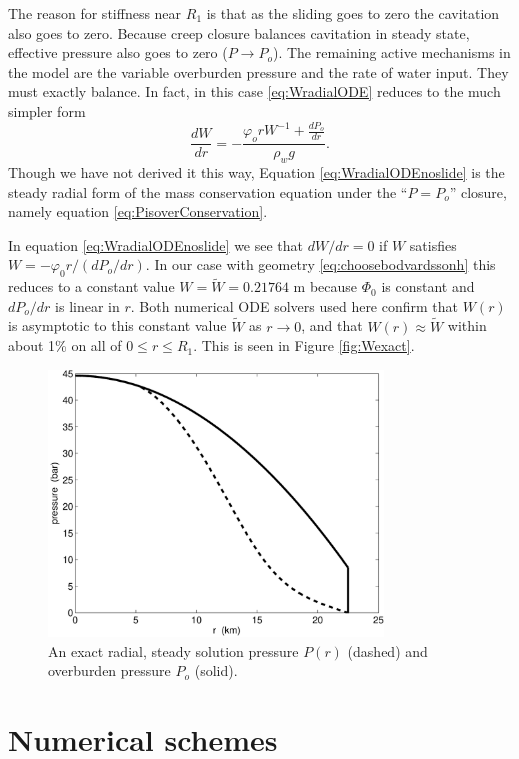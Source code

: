 \documentclass[11pt,final]{amsart}
\begin{document}
The reason for stiffness near $R_1$ is that as the sliding goes to zero the cavitation also goes to zero.  Because creep closure balances cavitation in steady state, effective pressure also goes to zero ($P\to P_o$).  The remaining active mechanisms in the model are the variable overburden pressure and the rate of water input.  They must exactly balance.  In fact, in this case \eqref{eq:WradialODE} reduces to the much simpler form
\begin{equation}
\frac{dW}{dr} = - \frac{\varphi_o r W^{-1} + \frac{dP_o}{dr}}{\rho_w g}. \label{eq:WradialODEnoslide}
\end{equation}
Though we have not derived it this way, Equation \eqref{eq:WradialODEnoslide} is the steady radial form of the mass conservation equation under the ``$P=P_o$'' closure, namely equation \eqref{eq:PisoverConservation}.

In equation \eqref{eq:WradialODEnoslide} we see that $dW/dr=0$ if $W$ satisfies $W = - \varphi_0 r / (dP_o/dr)$.  In our case with geometry \eqref{eq:choosebodvardssonh} this reduces to a constant value $W=\tilde W= 0.21764$ m because $\Phi_0$ is constant and $dP_o/dr$ is linear in $r$.  Both numerical ODE solvers used here confirm that $W(r)$ is asymptotic to this constant value $\tilde W$ as $r\to 0$, and that $W(r)\approx \tilde W$ within about 1\% on all of $0\le r \le R_1$.  This is seen in Figure \ref{fig:Wexact}.

\begin{figure}[ht]
\includegraphics[width=3.5in,keepaspectratio=true]{exact-P-plot}
\caption{An exact radial, steady solution pressure $P(r)$ (dashed) and overburden pressure $P_o$ (solid).}
\label{fig:Pexact}
\end{figure}


\section{Numerical schemes}  \label{sec:num}
\end{document}
